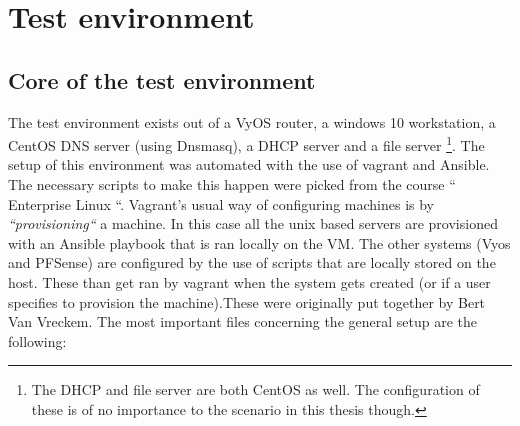 

\chapter{Test environment}
\label{ch:TestEnvironment1}

\section{Core of the test environment}
The test environment exists out of a VyOS router, a windows 10 workstation, a CentOS DNS server (using Dnsmasq), a DHCP server and a file server \footnote{The DHCP and file server are both CentOS as well. The configuration of these is of no importance to the scenario in this thesis though.}. The setup of this environment was automated with the use of vagrant and Ansible. The necessary scripts to make this happen were picked from the course `` Enterprise Linux ``. Vagrant's usual way of configuring machines is by \textit{``provisioning``} a machine. In this case all the unix based servers are provisioned with an Ansible playbook that is ran locally on the VM. The other systems (Vyos and PFSense) are configured by the use of scripts that are locally stored on the host. These than get ran by vagrant when the system gets created (or if a user specifies to provision the machine).These were originally put together by Bert Van Vreckem. The most important files concerning the general setup are the following:

